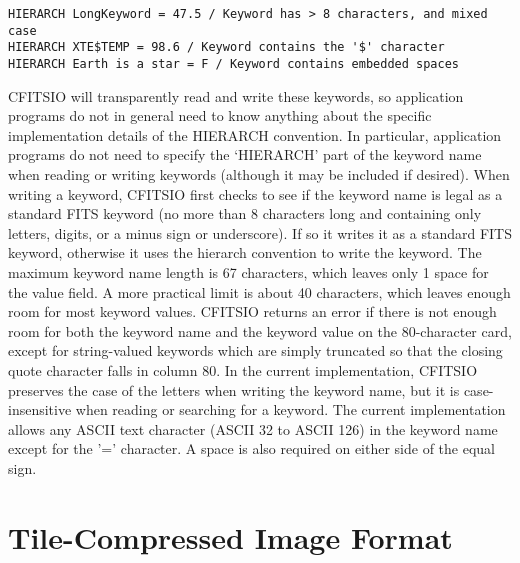\documentclass[11pt]{book}
\begin{document}
\begin{verbatim}
HIERARCH LongKeyword = 47.5 / Keyword has > 8 characters, and mixed case
HIERARCH XTE$TEMP = 98.6 / Keyword contains the '$' character
HIERARCH Earth is a star = F / Keyword contains embedded spaces
\end{verbatim}
CFITSIO will transparently read and write these keywords, so application
programs do not in general need to know anything about the specific
implementation details of the HIERARCH convention.  In particular,
application programs do not need to specify the `HIERARCH' part of the
keyword name when reading or writing keywords (although it
may be included if desired).  When writing a keyword, CFITSIO first
checks to see if the keyword name is legal as a standard FITS keyword
(no more than 8 characters long and containing only letters, digits, or
a minus sign or underscore). If so it writes it as a standard FITS
keyword, otherwise it uses the hierarch convention to write the
keyword.   The maximum keyword name length is 67 characters, which
leaves only 1 space for the value field.  A more practical limit is
about 40 characters, which leaves enough room for most keyword values.
CFITSIO returns an error if there is not enough room for both the
keyword name and the keyword value on the 80-character card, except for
string-valued keywords which are simply truncated so that the closing
quote character falls in column 80.  In the current implementation,
CFITSIO preserves the case of the letters when writing the keyword
name, but it is case-insensitive when reading or searching for a
keyword.  The current implementation allows any ASCII text character
(ASCII 32 to ASCII 126) in the keyword name except for the '='
character.  A space is also required on either side of the equal sign.


\section{Tile-Compressed Image Format}
\end{document}
